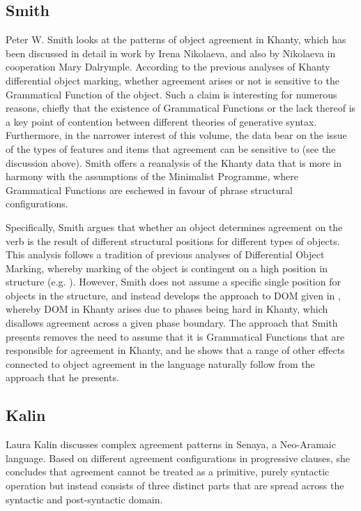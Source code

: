 \documentclass[output=paper
,modfonts
,nonflat]{langsci/langscibook}
\begin{document}
\subsection{Smith}
\label{sec:smith}

Peter W. Smith looks at the patterns of object agreement in Khanty, which has been discussed in detail in work by Irena Nikolaeva, and also by Nikolaeva in cooperation Mary Dalrymple.
According to the previous analyses of Khanty differential object marking, whether agreement arises or not is sensitive to the Grammatical Function of the object.
Such a claim is interesting for numerous reasons, chiefly that the existence of Grammatical Functions or the lack thereof is a key point of contention between different theories of generative syntax.
Furthermore, in the narrower interest of this volume, the data bear on the issue of the types of features and items that agreement can be sensitive to (see the discussion above).
Smith offers a reanalysis of the Khanty data that is more in harmony with the assumptions of the Minimalist Programme, where Grammatical Functions are eschewed in favour of phrase structural configurations.

Specifically, Smith argues that whether an object determines agreement on the verb is the result of different structural positions for different types of objects.
This analysis follows a tradition of previous analyses of Differential Object Marking, whereby marking of the object is contingent on a high position in structure (e.g. \citealt{bakervinokurova2010,woolford2001}).
However, Smith does not assume a specific single position for objects in the structure, and instead develops the approach to DOM given in \citet{Baker2015}, whereby DOM in Khanty arises due to phases being hard in Khanty, which disallows agreement across a given phase boundary.
The approach that Smith presents removes the need to assume that it is Grammatical Functions that are responsible for agreement in Khanty, and he shows that a range of other effects connected to object agreement in the language naturally follow from the approach that he presents.

\subsection{Kalin}
\label{sec:kalin}

Laura Kalin discusses complex agreement patterns in Senaya, a Neo-Aramaic language. Based on different agreement configurations in progressive clauses, she concludes that agreement cannot be treated as a primitive, purely syntactic operation but instead consists of three distinct parts that are spread across the syntactic and post-syntactic domain.
\end{document}
